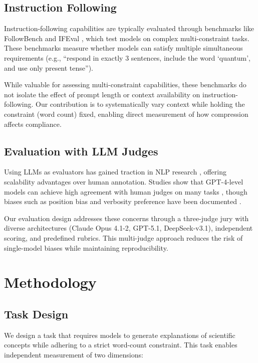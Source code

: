 \documentclass[11pt]{article}
\begin{document}
\subsection{Instruction Following}

Instruction-following capabilities are typically evaluated through benchmarks like FollowBench \citep{jiang2024followbench} and IFEval \citep{zhou2023ifeval}, which test models on complex multi-constraint tasks. These benchmarks measure whether models can satisfy multiple simultaneous requirements (e.g., ``respond in exactly 3 sentences, include the word `quantum', and use only present tense'').

While valuable for assessing multi-constraint capabilities, these benchmarks do not isolate the effect of prompt length or context availability on instruction-following. Our contribution is to systematically vary context while holding the constraint (word count) fixed, enabling direct measurement of how compression affects compliance.

\subsection{Evaluation with LLM Judges}

Using LLMs as evaluators has gained traction in NLP research \citep{zheng2023judging}, offering scalability advantages over human annotation. Studies show that GPT-4-level models can achieve high agreement with human judges on many tasks \citep{liu2023gpteval}, though biases such as position bias and verbosity preference have been documented \citep{wang2023largescale}.

Our evaluation design addresses these concerns through a three-judge jury with diverse architectures (Claude Opus 4.1-2, GPT-5.1, DeepSeek-v3.1), independent scoring, and predefined rubrics. This multi-judge approach reduces the risk of single-model biases while maintaining reproducibility.

\section{Methodology}

\subsection{Task Design}

We design a task that requires models to generate explanations of scientific concepts while adhering to a strict word-count constraint. This task enables independent measurement of two dimensions:
\end{document}
